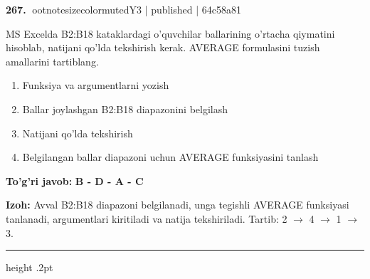 \documentclass[10pt,a4paper]{article}
\begin{document}
\textbf{\color{ink}267.} {ootnotesizecolor{muted}Y3 | published | 64c58a81}
\par
MS Excelda B2:B18 kataklardagi o'quvchilar ballarining o'rtacha qiymatini hisoblab, natijani qo'lda tekshirish kerak. AVERAGE formulasini tuzish amallarini tartiblang.
\begin{enumerate}[label=\Alph*),leftmargin=9mm]
\item Funksiya va argumentlarni yozish
\item Ballar joylashgan B2:B18 diapazonini belgilash
\item Natijani qo'lda tekshirish
\item Belgilangan ballar diapazoni uchun AVERAGE funksiyasini tanlash
\end{enumerate}
\begin{tcolorbox}[enhanced,breakable,colback=teal!4,colframe=teal!55!black,boxrule=0.45pt,arc=1.2mm,left=2.8mm,right=2.8mm,top=2mm,bottom=2mm]
\textbf{\color{teal}To'g'ri javob:} \textbf{B - D - A - C}
\par\smallskip
\textbf{Izoh:} Avval B2:B18 diapazoni belgilanadi, unga tegishli AVERAGE funksiyasi tanlanadi, argumentlari kiritiladi va natija tekshiriladi. Tartib: 2 \ensuremath{\rightarrow} 4 \ensuremath{\rightarrow} 1 \ensuremath{\rightarrow} 3.
\end{tcolorbox}
\vspace{2mm}\hrule height .2pt\vspace{2mm}
\end{document}
